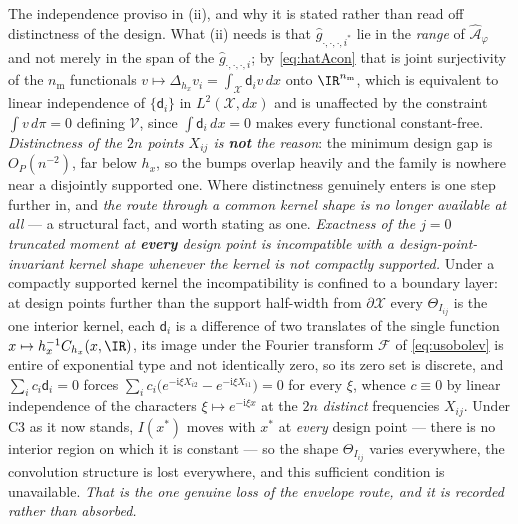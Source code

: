 \begin{proposition}
The independence proviso in (ii), and why it is stated rather than read off distinctness of the
design. What (ii) needs is that $\hat g_{\cdot,\cdot,\cdot,i^\ast}$ lie in the \emph{range} of
$\hat{\mathcal A}_{\varphi}$ and not merely in the span of the $\hat g_{\cdot,\cdot,\cdot,i}$; by
\eqref{eq:hatAcon} that is joint surjectivity of the $n_{\mathrm m}$ functionals
$v\mapsto\Delta_{h_x}v_i=\int_{\mathcal X}\mathsf d_iv\,dx$ onto $\IR^{n_{\mathrm m}}$, which is
equivalent to linear independence of $\{\mathsf d_i\}$ in $L^{2}(\mathcal X,dx)$ and is unaffected by
the constraint $\int v\,d\pi=0$ defining $\mathcal V$, since $\int\mathsf d_i\,dx=0$ makes every
functional constant-free. \emph{Distinctness of the $2n$ points $X_{ij}$ is \textbf{not} the reason}: the
minimum design gap is $O_P(n^{-2})$, far below
$h_x$, so the bumps overlap heavily and the family is nowhere near a disjointly supported one.
Where distinctness genuinely enters is one step further in, and \emph{the route through a common
kernel shape is no longer available at all} --- a structural fact, and worth stating as one.
\emph{Exactness of the $j=0$ truncated moment at \textbf{every} design point is incompatible with a
design-point-invariant kernel shape whenever the kernel is not compactly supported.} Under a
compactly supported kernel the incompatibility is confined to a boundary layer: at design points
further than the support half-width from $\partial\mathcal X$ every $\Theta_{I_{ij}}$ is the one
interior kernel, each $\mathsf d_i$ is a difference of two translates of the single function
$x\mapsto h_x^{-1}C_{h_x}(x,\IR)$, its image under the Fourier transform $\mathcal F$ of
\eqref{eq:usobolev} is entire of exponential type and not identically
zero, so its zero set is discrete, and $\sum_ic_i\mathsf d_i=0$ forces
$\sum_ic_i\big(e^{-\mathrm i\xi X_{i2}}-e^{-\mathrm i\xi X_{i1}}\big)=0$ for every $\xi$, whence
$c\equiv0$ by linear independence of the characters $\xi\mapsto e^{-\mathrm i\xi x}$ at the $2n$
\emph{distinct} frequencies $X_{ij}$. Under C3 as it now stands, $I(x^\ast)$ moves with $x^\ast$ at
\emph{every} design point --- there is no interior region on which it is constant --- so the shape
$\Theta_{I_{ij}}$ varies everywhere, the convolution structure is lost everywhere, and this sufficient
condition is unavailable. \emph{That is the one genuine loss of the envelope route, and it is
recorded rather than absorbed.}

\end{proposition}
